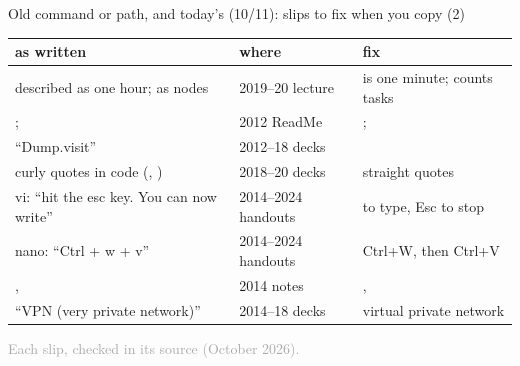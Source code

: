 \documentclass[aspectratio=169,11pt]{beamer}
\newcommand{\sourcecredit}[1]{\vfill\begin{flushright}\tiny\textcolor{DarkGray}{#1}\end{flushright}}
\newcommand{\curlyclose}{\textcolor{RubineRed}{\rmfamily\textquotedblright}}
\begin{document}
\begin{frame}{Old command or path, and today's (10/11): slips to fix when you copy (2)}
\label{fr:slipsb}
\scriptsize
\renewcommand{\arraystretch}{1.1}
\setlength{\tabcolsep}{3pt}
\begin{tabular}{@{}L{0.42\textwidth}L{0.24\textwidth}L{0.29\textwidth}@{}}
\toprule
as written & where & fix \\
\midrule
{} described as one hour;  as nodes & 2019--20 lecture &  is one minute;  counts tasks \\
;  & 2012 ReadMe & ;  \\
``Dump.visit'' & 2012--18 decks &  \\
curly quotes in code (\code{\curlyclose{}}, ) & 2018--20 decks & straight quotes \\
vi: ``hit the esc key. You can now write'' & 2014--2024 handouts &  to type, Esc to stop \\
nano: ``Ctrl + w + v'' & 2014--2024 handouts & Ctrl+W, then Ctrl+V \\
,  & 2014 notes & ,  \\
``VPN (very private network)'' & 2014--18 decks & virtual private network \\
\bottomrule
\end{tabular}
\sourcecredit{Each slip, checked in its source (October 2026).}
\end{frame}
\end{document}
